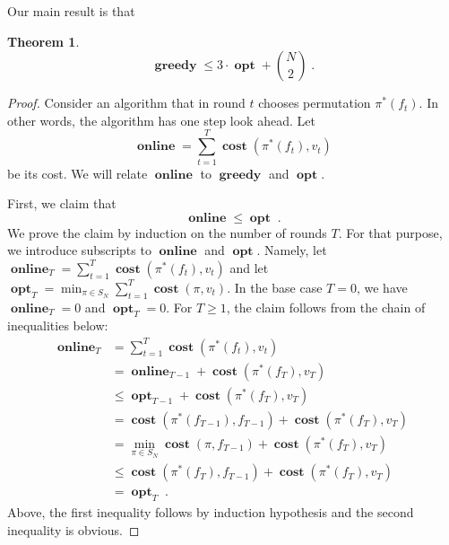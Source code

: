 \documentclass[12pt]{article}
\newtheorem{theorem}[lemma]{Theorem}
\DeclareMathOperator{\cost}{\mathbf{cost}}
\DeclareMathOperator{\greedy}{\mathbf{greedy}}
\DeclareMathOperator{\online}{\mathbf{online}}
\DeclareMathOperator{\opt}{\mathbf{opt}}
\begin{document}
Our main result is that

\begin{theorem}
$$
\greedy \le 3 \cdot \opt + \binom{N}{2} \; .
$$
\end{theorem}

\begin{proof}
Consider an algorithm that in round $t$ chooses permutation $\pi^*(f_t)$.
In other words, the algorithm has one step look ahead. Let
$$
\online = \sum_{t=1}^T \cost(\pi^*(f_t), v_t)
$$
be its cost. We will relate $\online$ to $\greedy$ and $\opt$.

First, we claim that
\begin{equation}
\label{equation:claim}
\online \le \opt \; .
\end{equation}
We prove the claim by induction on the number of rounds $T$. For that purpose,
we introduce subscripts to $\online$ and $\opt$. Namely, let $\online_T =
\sum_{t=1}^T \cost(\pi^*(f_t), v_t)$ and let $\opt_T = \min_{\pi \in S_N}
\sum_{t=1}^T \cost(\pi, v_t)$. In the base case $T=0$, we have $\online_T = 0$
and $\opt_T = 0$. For $T \ge 1$, the claim follows from the chain of
inequalities below:
\begin{align*}
\online_T
& = \sum_{t=1}^T \cost(\pi^*(f_t), v_t) \\
& = \online_{T-1} + \cost(\pi^*(f_T), v_T) \\
& \le \opt_{T-1} + \cost(\pi^*(f_T), v_T) \\
& = \cost(\pi^*(f_{T-1}), f_{T-1}) + \cost(\pi^*(f_T), v_T) \\
& = \min_{\pi \in S_N} \cost(\pi, f_{T-1}) + \cost(\pi^*(f_T), v_T) \\
& \le \cost(\pi^*(f_T), f_{T-1}) + \cost(\pi^*(f_T), v_T) \\
& = \opt_T \; .
\end{align*}
Above, the first inequality follows by induction hypothesis and
the second inequality is obvious.


\end{proof}
\end{document}
